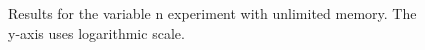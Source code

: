 \documentclass[a4paper,10pt]{article}
\begin{document}
\begin{figure}
\centering
{}
\caption{Results for the variable n experiment with unlimited memory. The y-axis uses logarithmic scale. \label{fig:variable-count-u}}
\end{figure}
\end{document}
